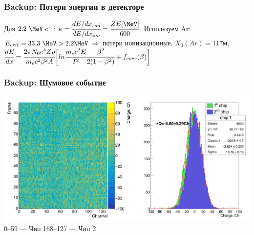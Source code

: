 \documentclass[14pt]{beamer}
\begin{document}
\begin{frame}[t]
\frametitle{Backup: Потери энергии в детекторе}
Для $2.2~\MeV~e^{-}$:
\newline
\newline $\kappa = \cfrac{dE/dx_{rad}}{dE/dx_{ion}}= \cfrac{ Z E[\MeV] }{600}.$
\newline 
\newline Используем Ar: $E_{crit} = 33.3~\MeV > 2.2 \MeV~\Rightarrow$ потери ионизационные.
\newline
\newline $X_0(Ar)=117$м,
\newline
\newline $\cfrac{dE}{dx} = \cfrac{2\pi N_0 e^4 Z\rho}{m_e c^2 \beta^2 A}\biggl[ln\cfrac{ m_ec^2E}{I^2}\cfrac{\beta^2}{2(1-\beta^2)} + f_{corr}(\beta)\biggr]$

\end{frame}

\begin{frame}[c]
\frametitle{Backup: Шумовое событие}
\includegraphics[width=1\linewidth]{Noise_no_filtering.png}
\hspace*{20pt}\tiny{0--59 --- Чип 1}\hspace*{30pt}\tiny{68--127 --- Чип 2}
\end{frame}
\end{document}
